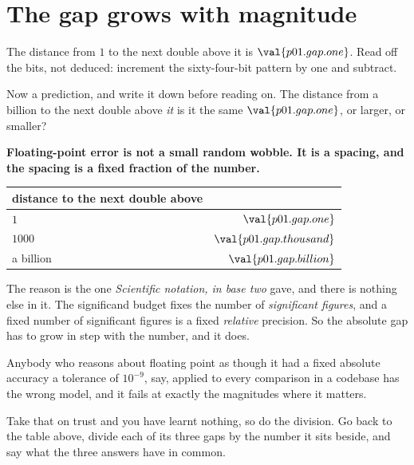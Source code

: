 
\section{The gap grows with magnitude}
\label{sec:P01-gap}

\begin{fr}
The distance from $1$ to the next double above it is $\val{p01.gap.one}$. Read
off the bits, not deduced: increment the sixty-four-bit pattern by one and
subtract.

Now a prediction, and write it down before reading on. The distance from a
billion to the next double above \emph{it} \dash{} is it the same
$\val{p01.gap.one}$, or larger, or smaller?
\nextframe
\end{fr}

\begin{fr}
\begin{trapbox}
\textbf{Floating-point error is not a small random wobble. It is a spacing,
and the spacing is a fixed fraction of the number.}

\begin{center}
\begin{tabular}{lr}
\toprule
distance to the next double above & \\
\midrule
$1$ & $\val{p01.gap.one}$ \\
$1000$ & $\val{p01.gap.thousand}$ \\
a billion & $\val{p01.gap.billion}$ \\
\bottomrule
\end{tabular}
\end{center}

The reason is the one \emph{Scientific notation, in base two} gave, and there
is nothing else in it. The significand budget fixes the number of
\emph{significant figures}, and a fixed number of significant figures is a
fixed \emph{relative} precision. So the absolute gap has to grow in step with
the number, and it does.

Anybody who reasons about floating point as though it had a fixed absolute
accuracy \dash{} a tolerance of $10^{-9}$, say, applied to every comparison in
a codebase \dash{} has the wrong model, and it fails at exactly the magnitudes
where it matters.
\end{trapbox}

Take that on trust and you have learnt nothing, so do the division. Go back to
the table above, divide each of its three gaps by the number it sits beside,
and say what the three answers have in common.
\dotline
\nextframe
\end{fr}

